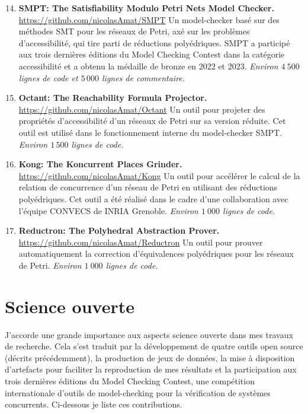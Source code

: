 \begin{enumerate}
  \setcounter{enumi}{13}
  \item \textbf{SMPT: The Satisfiability Modulo Petri Nets Model Checker.}
  \smallbreak
  \url{https://github.com/nicolasAmat/SMPT}
  \smallbreak
  Un model-checker basé sur des méthodes SMT pour les réseaux de Petri, axé sur
  les problèmes d'accessibilité, qui tire parti de réductions polyédriques.
  \textsf{SMPT} a participé aux trois dernières éditions du Model Checking
  Contest dans la catégorie \og accessibilité \fg et a obtenu la médaille de bronze
  en 2022 et 2023.
  \smallbreak
  \emph{Environ $4\ 500$ lignes de code et $5\, 000$ lignes de commentaire.}
  \smallbreak
  \item \textbf{Octant: The Reachability Formula Projector.}
  \smallbreak
  \url{https://github.com/nicolasAmat/Octant}
  \smallbreak
  Un outil pour projeter des propriétés d'accessibilité d'un réseaux de Petri
  sur sa version réduite. Cet outil est utilisé dans le fonctionnement interne
  du model-checker \textsf{SMPT}.
  \smallbreak
  \emph{Environ $1\,500$ lignes de code.}
  \smallbreak

  \item \textbf{Kong: The Koncurrent Places Grinder.}
  \smallbreak
  \url{https://github.com/nicolasAmat/Kong}
  \smallbreak
  Un outil pour accélérer le calcul de la relation de concurrence d'un réseau de
  Petri en utilisant des réductions polyédriques. Cet outil a été réalisé dans
  le cadre d'une collaboration avec l'équipe CONVECS de INRIA Grenoble.
  \smallbreak
  \emph{Environ $1\ 000$ lignes de code.}
  \smallbreak
  \item \textbf{Reductron: The Polyhedral Abstraction Prover.}
  \smallbreak
  \url{https://github.com/nicolasAmat/Reductron}
  \smallbreak
  Un outil pour prouver automatiquement la correction d'équivalences
  polyédriques pour les réseaux de Petri.
  \smallbreak
  \emph{Environ $1\ 000$ lignes de code.}
\end{enumerate}
\vspace{10pt}



\section*{Science ouverte}
\vspace{10pt}
J'accorde une grande importance aux aspects \og science ouverte \fg dans mes travaux
de recherche. Cela s'est traduit par la développement de quatre outils open
source (décrits précédemment), la production de jeux de données, la mise à
disposition d'artefacts pour faciliter la reproduction de mes résultats et la
participation aux trois dernières éditions du Model Checking Contest, une
compétition internationale d'outils de model-checking pour la vérification de
systèmes concurrents. Ci-dessous je liste ces contributions.

